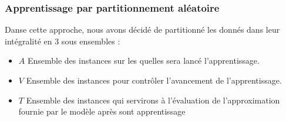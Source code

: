 \subsubsection{Apprentissage par partitionnement aléatoire}\label{randomPartLearning}
Danse cette approche, nous avons décidé de partitionné les donnés dans leur intégralité en 3 sous ensembles : 
\begin{itemize}
	\item $A$ Ensemble des instances sur les quelles sera lancé l'apprentissage.
	\item $V$ Ensemble des instances pour contrôler l'avancement de l'apprentissage.
	\item $T$ Ensemble des instances qui servirons à l'évaluation de l'approximation fournie par le modèle après sont apprentissage 
\end{itemize}

